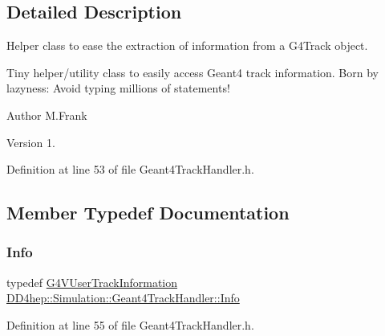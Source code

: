 \subsection{Detailed Description}
Helper class to ease the extraction of information from a G4\+Track object. 

Tiny helper/utility class to easily access Geant4 track information. Born by lazyness\+: Avoid typing millions of statements!

\begin{DoxyAuthor}{Author}
M.\+Frank 
\end{DoxyAuthor}
\begin{DoxyVersion}{Version}
1. 
\end{DoxyVersion}


Definition at line 53 of file Geant4\+Track\+Handler.\+h.



\subsection{Member Typedef Documentation}
\hypertarget{class_d_d4hep_1_1_simulation_1_1_geant4_track_handler_a0db29f37f6c64822f75c656ac27c03b4}{}\label{class_d_d4hep_1_1_simulation_1_1_geant4_track_handler_a0db29f37f6c64822f75c656ac27c03b4} 
\subsubsection{\texorpdfstring{Info}{Info}}
{\footnotesize\ttfamily typedef \hyperlink{class_g4_v_user_track_information}{G4\+V\+User\+Track\+Information} \hyperlink{class_d_d4hep_1_1_simulation_1_1_geant4_track_handler_a0db29f37f6c64822f75c656ac27c03b4}{D\+D4hep\+::\+Simulation\+::\+Geant4\+Track\+Handler\+::\+Info}}



Definition at line 55 of file Geant4\+Track\+Handler.\+h.

\hypertarget{class_d_d4hep_1_1_simulation_1_1_geant4_track_handler_a7db438397a8ccd838ba7bf5fe1b75bdb}{}\label{class_d_d4hep_1_1_simulation_1_1_geant4_track_handler_a7db438397a8ccd838ba7bf5fe1b75bdb} 
